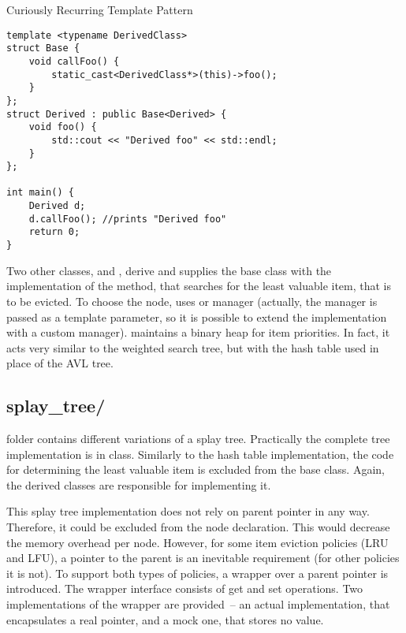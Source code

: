 \begin{listing}[tbp]
\caption{Curiously Recurring Template Pattern}
\label{lst:crtp}
\begin{verbatim}
template <typename DerivedClass>
struct Base {
    void callFoo() {
        static_cast<DerivedClass*>(this)->foo();
    }
};
struct Derived : public Base<Derived> {
    void foo() {
        std::cout << "Derived foo" << std::endl;
    }
};

int main() {
    Derived d;
    d.callFoo(); //prints "Derived foo"
    return 0;
}
\end{verbatim}
\end{listing}

Two other classes,  and , derive  and supplies the base class with the implementation of the method, that searches for the least valuable item, that is to be evicted. To choose the node,  uses  or  manager (actually, the manager is passed as a template parameter, so it is possible to extend the implementation with a custom manager).  maintains a binary heap for item priorities. In fact, it acts very similar to the weighted search tree, but with the hash table used in place of the AVL tree.

\subsection{splay\_tree/}
 folder contains different variations of a splay tree. Practically the complete tree implementation is in  class. Similarly to the hash table implementation, the code for determining the least valuable item is excluded from the base class. Again, the derived classes are responsible for implementing it.

This splay tree implementation does not rely on parent pointer in any way. Therefore, it could be excluded from the node declaration. This would decrease the memory overhead per node. However, for some item eviction policies (LRU and LFU), a pointer to the parent is an inevitable requirement (for other policies it is not). To support both types of policies, a wrapper over a parent pointer is introduced. The wrapper interface consists of get and set operations. Two implementations of the wrapper are provided~-- an actual implementation, that encapsulates a real pointer, and a mock one, that stores no value.

